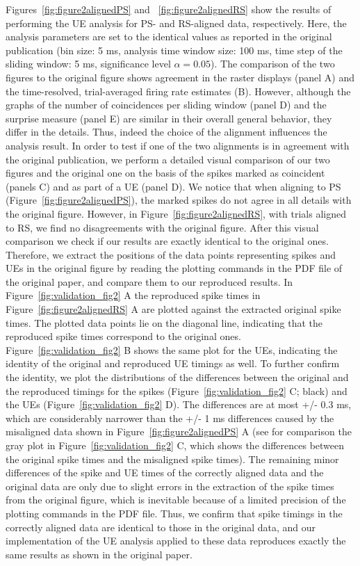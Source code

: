 \documentclass[10pt,a4paper,onecolumn]{article}
\begin{document}
Figures~\ref{fig:figure2alignedPS} and ~\ref{fig:figure2alignedRS} show
the results of performing the UE analysis for PS- and RS-aligned data,
respectively. Here, the analysis parameters are set to the identical
values as reported in the original publication (bin size: 5 ms, analysis
time window size: 100 ms, time step of the sliding window: 5 ms,
significance level \(\alpha= 0.05\)). The comparison of the two figures
to the original figure shows agreement in the raster displays (panel A)
and the time-resolved, trial-averaged firing rate estimates (B).
However, although the graphs of the number of coincidences per sliding
window (panel D) and the surprise measure (panel E) are similar in their
overall general behavior, they differ in the details. Thus, indeed the
choice of the alignment influences the analysis result. In order to test
if one of the two alignments is in agreement with the original
publication, we perform a detailed visual comparison of our two figures
and the original one on the basis of the spikes marked as coincident
(panels C) and as part of a UE (panel D). We notice that when aligning
to PS (Figure~\ref{fig:figure2alignedPS}), the marked spikes do not
agree in all details with the original figure. However, in
Figure~\ref{fig:figure2alignedRS}, with trials aligned to RS, we find no
disagreements with the original figure. After this visual comparison we
check if our results are exactly identical to the original ones.
Therefore, we extract the positions of the data points representing
spikes and UEs in the original figure by reading the plotting commands
in the PDF file of the original paper, and compare them to our
reproduced results. In Figure~\ref{fig:validation_fig2} A the reproduced
spike times in Figure~\ref{fig:figure2alignedRS} A are plotted against
the extracted original spike times. The plotted data points lie on the
diagonal line, indicating that the reproduced spike times correspond to
the original ones. Figure~\ref{fig:validation_fig2} B shows the same
plot for the UEs, indicating the identity of the original and reproduced
UE timings as well. To further confirm the identity, we plot the
distributions of the differences between the original and the reproduced
timings for the spikes (Figure~\ref{fig:validation_fig2} C; black) and
the UEs (Figure~\ref{fig:validation_fig2} D). The differences are at
most +/- 0.3 ms, which are considerably narrower than the +/- 1 ms
differences caused by the misaligned data shown in
Figure~\ref{fig:figure2alignedPS} A (see for comparison the gray plot in
Figure~\ref{fig:validation_fig2} C, which shows the differences between
the original spike times and the misaligned spike times). The remaining
minor differences of the spike and UE times of the correctly aligned
data and the original data are only due to slight errors in the
extraction of the spike times from the original figure, which is
inevitable because of a limited precision of the plotting commands in
the PDF file. Thus, we confirm that spike timings in the correctly
aligned data are identical to those in the original data, and our
implementation of the UE analysis applied to these data reproduces
exactly the same results as shown in the original paper.
\end{document}
